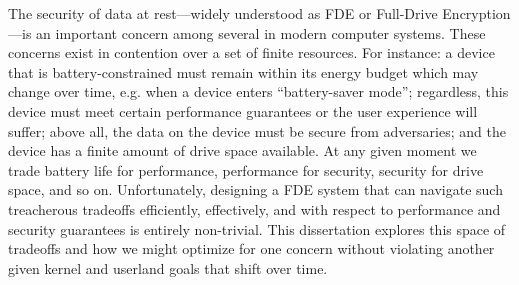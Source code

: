 \abstract
The security of data at rest---widely understood as FDE or Full-Drive
Encryption---is an important concern among several in modern computer systems.
These concerns exist in contention over a set of finite resources. For instance:
a device that is battery-constrained must remain within its energy budget which
may change over time, e.g. when a device enters ``battery-saver mode'';
regardless, this device must meet certain performance guarantees or the user
experience will suffer; above all, the data on the device must be secure from
adversaries; and the device has a finite amount of drive space available. At any
given moment we trade battery life for performance, performance for security,
security for drive space, and so on. Unfortunately, designing a FDE system that
can navigate such treacherous tradeoffs efficiently, effectively, and with
respect to performance and security guarantees is entirely non-trivial. This
dissertation explores this space of tradeoffs and how we might optimize for one
concern without violating another given kernel and userland goals that shift
over time.
